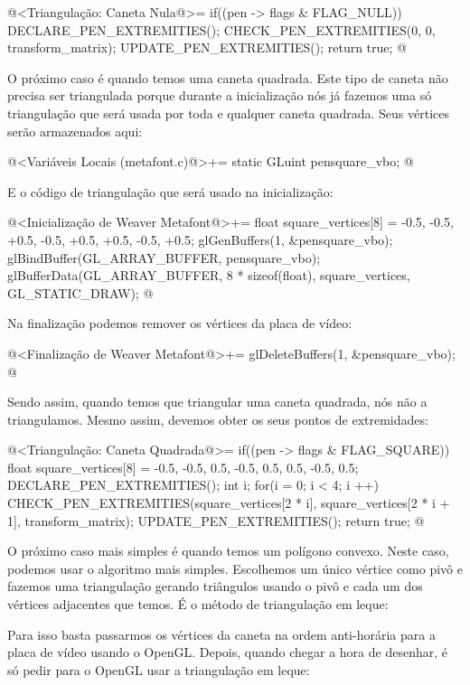 {\iniciocodigo
@<Triangulação: Caneta Nula@>=
if((pen -> flags & FLAG_NULL)){
  DECLARE_PEN_EXTREMITIES();
  CHECK_PEN_EXTREMITIES(0, 0, transform_matrix);
  UPDATE_PEN_EXTREMITIES();
  return true;
}
@
\fimcodigo

O próximo caso é quando temos uma caneta quadrada. Este tipo de caneta
não precisa ser triangulada porque durante a inicialização nós já
fazemos uma só triangulação que será usada por toda e qualquer caneta
quadrada. Seus vértices serão armazenados aqui:

\iniciocodigo
@<Variáveis Locais (metafont.c)@>+=
static GLuint pensquare_vbo;
@
\fimcodigo

E o código de triangulação que será usado na inicialização:

\iniciocodigo
@<Inicialização de Weaver Metafont@>+=
{
  float square_vertices[8] = {-0.5, -0.5,
                               +0.5, -0.5,
                               +0.5, +0.5,
                               -0.5, +0.5};
  glGenBuffers(1, &pensquare_vbo);
  glBindBuffer(GL_ARRAY_BUFFER, pensquare_vbo);
  glBufferData(GL_ARRAY_BUFFER, 8 * sizeof(float), square_vertices,
               GL_STATIC_DRAW);
}
@
\fimcodigo

Na finalização podemos remover os vértices da placa de vídeo:

\iniciocodigo
@<Finalização de Weaver Metafont@>+=
glDeleteBuffers(1, &pensquare_vbo);
@
\fimcodigo

Sendo assim, quando temos que triangular uma caneta quadrada, nós não
a triangulamos. Mesmo assim, devemos obter os seus pontos de
extremidades:

\iniciocodigo
@<Triangulação: Caneta Quadrada@>=
if((pen -> flags & FLAG_SQUARE)){
  float square_vertices[8] = {-0.5, -0.5, 0.5, -0.5, 0.5, 0.5, -0.5, 0.5};
  DECLARE_PEN_EXTREMITIES();
  int i;
  for(i = 0; i < 4; i ++)
    CHECK_PEN_EXTREMITIES(square_vertices[2 * i], square_vertices[2 * i + 1],
                          transform_matrix);
  UPDATE_PEN_EXTREMITIES();
  return true;
}
@
\fimcodigo

O próximo caso mais simples é quando temos um polígono convexo. Neste
caso, podemos usar o algoritmo mais simples. Escolhemos um único
vértice como pivô e fazemos uma triangulação gerando triângulos usando
o pivô e cada um dos vértices adjacentes que temos. É o método de
triangulação em leque:


Para isso basta passarmos os vértices da caneta na ordem anti-horária
para a placa de vídeo usando o OpenGL. Depois, quando chegar a hora de
desenhar, é só pedir para o OpenGL usar a triangulação em leque:

}
